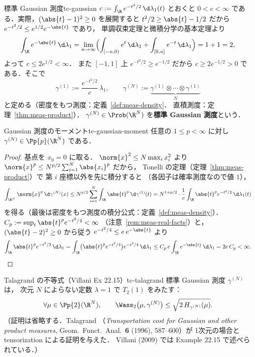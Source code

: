 \begin{definition}{標準 Gaussian 測度}{tc-gaussian}
  $c:=\int_\R e^{-t^2/2}\,\d\lambda_1(t)$ とおくと
  $0<c<\infty$ である．実際，$(\abs{t}-1)^2\geq0$ を展開すると
  $t^2/2\geq\abs{t}-1/2$ だから
  $e^{-t^2/2}\leq e^{1/2}e^{-\abs{t}}$ であり，
  単調収束定理と微積分学の基本定理より
  \[
    \int_\R e^{-\abs{t}}\,\d\lambda_1
    =\lim_{n\to\infty}\Bigl(
    \int_{[-n,0)}e^{t}\,\d\lambda_1+\int_{[0,n]}e^{-t}\,\d\lambda_1
    \Bigr)
    =1+1=2,
  \]
  よって $c\leq2e^{1/2}<\infty$．
  また $[-1,1]$ 上 $e^{-t^2/2}\geq e^{-1/2}$ だから
  $c\geq2e^{-1/2}>0$ である．そこで
  \[
    \gamma^{(1)}:=\frac{e^{-t^2/2}}{c}\,\lambda_1,
    \qquad
    \gamma^{(N)}:=
    \underbrace{\gamma^{(1)}\otimes\cdots\otimes\gamma^{(1)}}_{N}
  \]
  と定める（密度をもつ測度：定義~\ref{def:meas-density}．
  直積測度：定理~\ref{thm:meas-product}）．
  $\gamma^{(N)}\in\Prob(\R^N)$ を\textbf{標準 Gaussian 測度}という．
\end{definition}

\begin{lemma}{Gaussian 測度のモーメント}{tc-gaussian-moment}
  任意の $1\leq p<\infty$ に対し $\gamma^{(N)}\in\Pp{p}(\R^N)$ である．
\end{lemma}

\begin{proof}
  基点を $x_0=0$ に取る．
  $\norm{x}^2\leq N\max_ix_i^2$ より
  $\norm{x}^p\leq N^{p/2}\sum_{i=1}^N\abs{x_i}^p$ だから，
  Tonelli の定理（定理~\ref{thm:meas-product}）で
  第 $i$ 座標以外を先に積分すると
  （各因子は確率測度なので値 $1$），
  \[
    \int_{\R^N}\norm{x}^p\,\d\gamma^{(N)}(x)
    \leq N^{p/2}\sum_{i=1}^N\int_\R\abs{t}^p\,\d\gamma^{(1)}(t)
    =N^{1+p/2}\cdot\frac1c\int_\R\abs{t}^pe^{-t^2/2}\,\d\lambda_1(t)
  \]
  を得る（最後は密度をもつ測度の積分公式：定義~\ref{def:meas-density}）．
  $C_p:=\sup_t\abs{t}^pe^{-t^2/4}<\infty$
  （注意~\ref{rem:meas-real-facts}）と，
  $(\abs{t}-2)^2\geq0$ から従う
  $e^{-t^2/4}\leq e\,e^{-\abs{t}}$ より
  \[
    \int_\R\abs{t}^pe^{-t^2/2}\,\d\lambda_1
    =\int_\R\bigl(\abs{t}^pe^{-t^2/4}\bigr)e^{-t^2/4}\,\d\lambda_1
    \leq C_p\,e\int_\R e^{-\abs{t}}\,\d\lambda_1
    =2e\,C_p<\infty.  \qedhere
  \]
\end{proof}

\begin{theorem}{Talagrand の不等式（Villani Ex 22.15）}{tc-talagrand}
  標準 Gaussian 測度 $\gamma^{(N)}$ は，
  次元 $N$ によらない定数 $\lambda=1$ で $T_2(1)$ をみたす：
  \[
    \forall\mu\in\Pp{2}(\R^N),\qquad
    \Wass_2\bigl(\mu,\gamma^{(N)}\bigr)
    \leq\sqrt{2\,H_{\gamma^{(N)}}(\mu)}.
  \]
  （証明は省略する．Talagrand
  （\emph{Transportation cost for Gaussian and other product measures},
  Geom.\ Funct.\ Anal.\ \textbf{6} (1996), 587--600）が
  1次元の場合と tensorization による証明を与えた．
  Villani (2009) では Example 22.15 で述べられている．）
\end{theorem}

